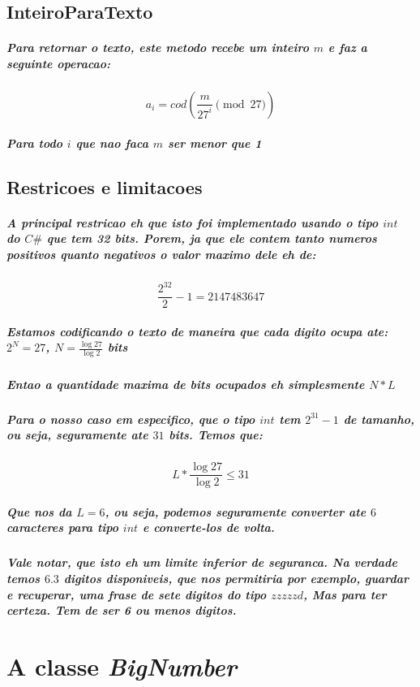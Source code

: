 \documentclass[12pt,twoside, a4paper, twocolumn]{article}
\begin{document}
\subsection{InteiroParaTexto}

\subparagraph*{Para retornar o texto, este metodo recebe um inteiro $m$ e faz a seguinte operacao:}

\begin{equation}
    a_i    = cod\left(\frac{m}{27^i} \pmod{27}\right)
\end{equation}

\subparagraph*{Para todo $i$ que nao faca $m$ ser menor que 1}

\subsection{Restricoes e limitacoes}

\subparagraph*{A principal restricao eh que isto foi implementado usando o tipo $int$ do $C\#$ que tem 32 bits. Porem, ja que ele contem tanto numeros positivos quanto negativos o valor maximo dele eh de:}

\begin{equation}
    \frac{2^{32}}{2} - 1 = 2147483647
\end{equation}

\subparagraph*{Estamos codificando o texto de maneira que cada digito ocupa ate: $2^N = 27$, $N = \frac{\log{27}}{\log{2}}$ bits}

\subparagraph*{ Entao a quantidade maxima de bits ocupados eh simplesmente $N*L$}

\subparagraph*{Para o nosso caso em especifico, que o tipo $int$ tem $2^{31} -1$ de tamanho, ou seja, seguramente ate $31$ bits. Temos que:}

\begin{equation}
    L * \frac{\log{27}}{\log{2}} \le 31
\end{equation}

\subparagraph*{Que nos da $L = 6$, ou seja, podemos seguramente converter ate $6$ caracteres para tipo $int$ e converte-los de volta.
}

\subparagraph*{Vale notar, que isto eh um limite inferior de seguranca. Na verdade temos $6.3$ digitos disponiveis, que nos permitiria por exemplo, guardar e recuperar, uma frase de sete digitos do tipo $zzzzzd$, Mas para ter certeza. Tem de ser 6 ou menos digitos.}

\section{A classe \emph{BigNumber}}
\end{document}
